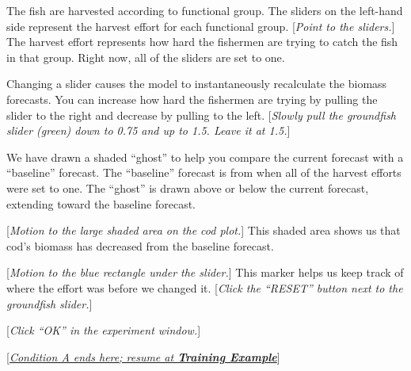 {{{The fish are harvested according to functional group.  The sliders on the left-hand side represent the harvest effort for each functional group.  [\textit{Point to the sliders.}]  The harvest effort represents how hard the fishermen are trying to catch the fish in that group.  Right now, all of the sliders are set to one.

Changing a slider causes the model to instantaneously recalculate the biomass forecasts.  You can increase how hard the fishermen are trying by pulling the slider to the right and decrease by pulling to the left.  [\textit{Slowly pull the groundfish slider (green) down to 0.75 and up to 1.5.  Leave it at 1.5.}]

We have drawn a shaded ``ghost'' to help you compare the current forecast with a ``baseline'' forecast.  The ``baseline'' forecast is from when all of the harvest efforts were set to one.  The ``ghost'' is drawn above or below the current forecast, extending toward the baseline forecast.

[\textit{Motion to the large shaded area on the cod plot.}]  This shaded area shows us that cod’s biomass has decreased from the baseline forecast.

[\textit{Motion to the blue rectangle under the slider.}] This marker helps us keep track of where the effort was before we changed it.  [\textit{Click the ``RESET'' button next to the groundfish slider.}]

[\textit{Click ``OK'' in the experiment window.}]

[\underline{\textit{Condition A ends here; resume at \textbf{Training Example}}}]

}}}
